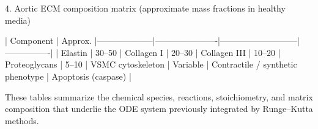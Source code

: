 4. Aortic ECM composition matrix (approximate mass fractions in healthy media)

| Component          | Approx. %
|--------------------|----------------------|---------------------------|----------------|
| Elastin            | 30–50 %
| Collagen I         | 20–30 %
| Collagen III       | 10–20 %
| Proteoglycans      | 5–10 %
| VSMC cytoskeleton  | Variable            | Contractile / synthetic phenotype | Apoptosis (caspase) |

These tables summarize the chemical species, reactions, stoichiometry, and matrix composition that underlie the ODE system previously integrated by Runge–Kutta methods.
